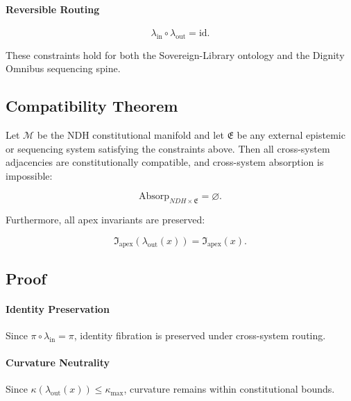 \paragraph{Reversible Routing}
\[
\lambda_{\mathrm{in}} \circ \lambda_{\mathrm{out}} = \mathrm{id}.
\]

These constraints hold for both the Sovereign-Library ontology and the Dignity
Omnibus sequencing spine.


\subsection{Compatibility Theorem}

\begin{theorem}
Let $\mathcal{M}$ be the NDH constitutional manifold and let $\mathfrak{E}$ be
any external epistemic or sequencing system satisfying the constraints above.
Then all cross-system adjacencies are constitutionally compatible, and
cross-system absorption is impossible:

\[
\mathrm{Absorp}_{NDH \times \mathfrak{E}} = \varnothing.
\]

Furthermore, all apex invariants are preserved:

\[
\mathfrak{I}_{\mathrm{apex}}(\lambda_{\mathrm{out}}(x))
=
\mathfrak{I}_{\mathrm{apex}}(x).
\]
\end{theorem}


\subsection{Proof}

\paragraph{Identity Preservation}
Since $\pi \circ \lambda_{\mathrm{in}} = \pi$, identity fibration is preserved
under cross-system routing.

\paragraph{Curvature Neutrality}
Since $\kappa(\lambda_{\mathrm{out}}(x)) \le \kappa_{\max}$, curvature remains
within constitutional bounds.


